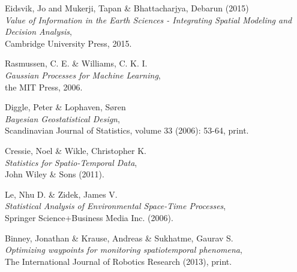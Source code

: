 \documentclass[a4paper,11pt,titlepage]{article}
\begin{document}
\newpage
\begin{thebibliography}{9}

 Eidsvik, Jo and Mukerji, Tapan \& Bhattacharjya, Debarun (2015) \\ \emph{Value of Information in the Earth Sciences - Integrating Spatial Modeling and Decision Analysis}, \\ Cambridge University Press, 2015. 

 Rasmussen, C. E. \& Williams, C. K. I. \\ \emph{Gaussian Processes for Machine Learning}, \\ the MIT Press, 2006.

Diggle, Peter \& Lophaven, Søren \\ \emph{Bayesian Geostatistical Design}, \\ Scandinavian Journal of Statistics, volume 33 (2006): 53-64, print.

 Cressie, Noel \& Wikle, Christopher K. \\ \emph{Statistics for Spatio-Temporal Data}, \\ John Wiley \& Sons (2011).

 Le, Nhu D. \& Zidek, James V. \\ \emph{Statistical Analysis of Environmental Space-Time Processes}, \\ Springer Science+Business Media Inc. (2006).

 Binney, Jonathan \& Krause, Andreas \& Sukhatme, Gaurav S. \\ \emph{Optimizing waypoints for monitoring spatiotemporal phenomena}, \\ The International Journal of Robotics Research (2013), print.


\end{thebibliography}
\end{document}
